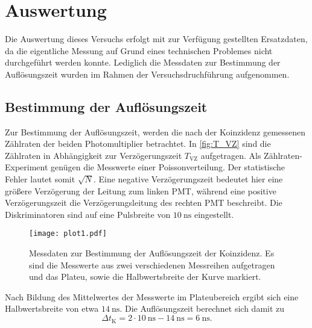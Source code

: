 \section{Auswertung}
\label{sec:Auswertung}
Die Auswertung dieses Versuchs erfolgt mit zur Verfügung gestellten Ersatzdaten, da die eigentliche Messung auf Grund eines technischen Problemes 
nicht durchgeführt werden konnte. Lediglich die Messdaten zur Bestimmung der Auflösungszeit wurden im Rahmen der Versuchsdruchführung aufgenommen.

\subsection{Bestimmung der Auflösungszeit}
Zur Bestimmung der Auflösungszeit, werden die nach der Koinzidenz gemessenen Zählraten der beiden Photomultiplier betrachtet. In \autoref{fig:T_VZ} sind 
die Zählraten in Abhängigkeit zur Verzögerungszeit $T_\text{VZ}$ aufgetragen. Als Zählraten-Experiment genügen die Messwerte einer Poissonverteilung. Der statistische 
Fehler lautet somit $\sqrt{N}$. 
Eine negative Verzögerungszeit bedeutet hier eine größere Verzögerung der 
Leitung zum linken PMT, während eine positive Verzögerungszeit die Verzögerungsleitung des rechten PMT beschreibt. Die Diskriminatoren sind auf eine Pulsbreite 
von $\qty{10}{\nano\second}$ eingestellt. 
\begin{figure}
  \centering
  \texttt{[image: plot1.pdf]}
  \caption{Messdaten zur Bestimmung der Auflösungszeit der Koinzidenz. Es sind die Messwerte aus zwei 
  verschiedenen Messreihen aufgetragen und das Plateu, sowie die Halbwertsbreite der Kurve markiert.}
  \label{fig:T_VZ}
\end{figure}
Nach Bildung des Mittelwertes der Messwerte im Plateubereich ergibt sich eine Halbwertsbreite von etwa $\qty{14}{\nano\second}$.
Die Auflösungszeit berechnet sich damit zu 
\begin{equation*}
  \Delta t_\text{K} = 2 \cdot \qty{10}{\nano\second} - \qty{14}{\nano\second} = \qty{6}{\nano\second}.
\end{equation*}

